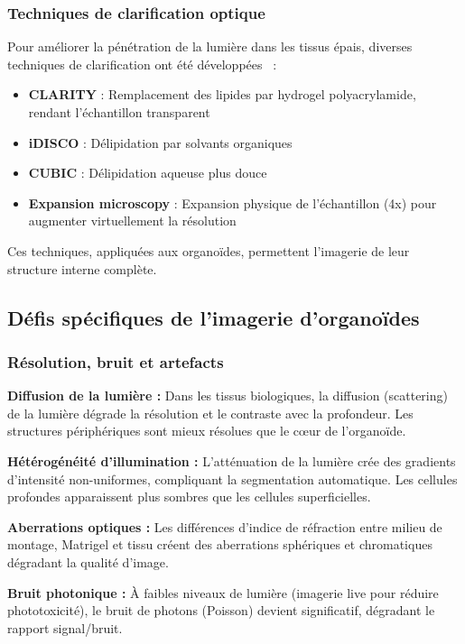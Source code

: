 \subsubsection{Techniques de clarification optique}

Pour améliorer la pénétration de la lumière dans les tissus épais, diverses techniques de clarification ont été développées~\cite{Chung2010} :
\begin{itemize}
    \item \textbf{CLARITY} : Remplacement des lipides par hydrogel polyacrylamide, rendant l'échantillon transparent
    \item \textbf{iDISCO} : Délipidation par solvants organiques
    \item \textbf{CUBIC} : Délipidation aqueuse plus douce
    \item \textbf{Expansion microscopy} : Expansion physique de l'échantillon (4x) pour augmenter virtuellement la résolution~\cite{Chen2015}
\end{itemize}

Ces techniques, appliquées aux organoïdes, permettent l'imagerie de leur structure interne complète.

\subsection{Défis spécifiques de l'imagerie d'organoïdes}

\subsubsection{Résolution, bruit et artefacts}

\textbf{Diffusion de la lumière :}
Dans les tissus biologiques, la diffusion (scattering) de la lumière dégrade la résolution et le contraste avec la profondeur. Les structures périphériques sont mieux résolues que le cœur de l'organoïde.

\textbf{Hétérogénéité d'illumination :}
L'atténuation de la lumière crée des gradients d'intensité non-uniformes, compliquant la segmentation automatique. Les cellules profondes apparaissent plus sombres que les cellules superficielles.

\textbf{Aberrations optiques :}
Les différences d'indice de réfraction entre milieu de montage, Matrigel et tissu créent des aberrations sphériques et chromatiques dégradant la qualité d'image.

\textbf{Bruit photonique :}
À faibles niveaux de lumière (imagerie live pour réduire phototoxicité), le bruit de photons (Poisson) devient significatif, dégradant le rapport signal/bruit.

